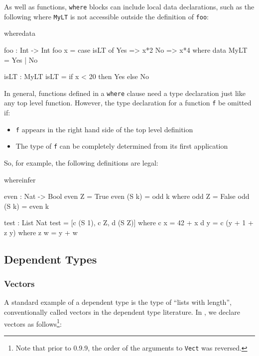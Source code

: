 As well as functions, \texttt{where} blocks can include local data
declarations, such as the following where \texttt{MyLT} is not accessible outside
the definition of \texttt{foo}:

\begin{SaveVerbatim}{wheredata}

foo : Int -> Int
foo x = case isLT of
            Yes => x*2
            No => x*4
    where
       data MyLT = Yes | No

       isLT : MyLT
       isLT = if x < 20 then Yes else No

\end{SaveVerbatim}

\noindent
In general, functions defined in a \texttt{where} clause need a type declaration
just like any top level function. However, the type declaration for
a function \texttt{f}  be omitted if:

\begin{itemize}
\item \texttt{f} appears in the right hand side of the top level definition 
\item The type of \texttt{f} can be completely determined from its first
application
\end{itemize}

\noindent
So, for example, the following definitions are legal:

\begin{SaveVerbatim}{whereinfer}

even : Nat -> Bool 
even Z = True
even (S k) = odd k where 
  odd Z = False
  odd (S k) = even k 

test : List Nat
test = [c (S 1), c Z, d (S Z)]
  where c x = 42 + x
        d y = c (y + 1 + z y)
              where z w = y + w

\end{SaveVerbatim}


\subsection{Dependent Types}

\subsubsection{Vectors}

A standard example of a dependent type is the type of ``lists with length'',
conventionally called vectors in the dependent type literature. In \Idris{},
we declare vectors as follows\footnote{Note that prior to \Idris{} 0.9.9,
the order of the arguments to \texttt{Vect} was reversed.}:

